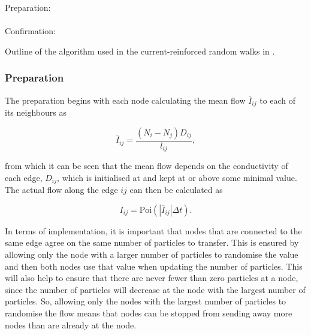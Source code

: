 {
\vspace{1em}
\begin{algorithm}[H]
Preparation:\\
\ \\
Confirmation:\\
\caption{Outline of the algorithm used in the current-reinforced random walks in \cite{Sumpter}.}
\label{alg:outline}
\end{algorithm}
\vspace{1em}
}

\subsubsection{Preparation}
\label{sec:preparation}
The preparation begins with each node calculating the mean flow $\bar{I}_{ij}$ to each of its neighbours as

\begin{equation}
\bar{I}_{ij} = \frac{(N_i - N_j)D_{ij}}{l_{ij}},
\end{equation}

 \noindent from which it can be seen that the mean flow depends on the conductivity of each edge, $D_{ij}$, which is initialised at and kept at or above some minimal value. The actual flow along the edge $ij$ can then be calculated as

\begin{equation}
I_{ij} = \text{Poi}(|\bar{I}_{ij}|\Delta t).
\end{equation}

In terms of implementation, it is important that nodes that are connected to the same edge agree on the same number of particles to transfer. This is ensured by allowing only the node with a larger number of particles to randomise the value and then both nodes use that value when updating the number of particles. This will also help to ensure that there are never fewer than zero particles at a node, since the number of particles will decrease at the node with the largest number of particles. So, allowing only the nodes with the largest number of particles to randomise the flow means that nodes can be stopped from sending away more nodes than are already at the node. 

